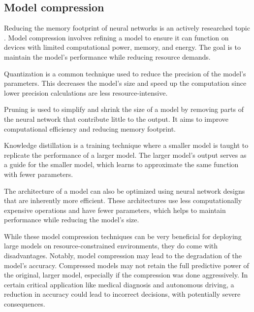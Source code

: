 \subsection{Model compression}
Reducing the memory footprint of neural networks is an actively researched topic \cite{neillOverviewNeuralNetwork2020, leEfficientNeuralNetworks2023}.
Model compression involves refining a model to ensure it can function on devices with limited computational power, memory, and energy.
The goal is to maintain the model's performance while reducing resource demands.

Quantization is a common technique used to reduce the precision of the model's parameters.
This decreases the model's size and speed up the computation since lower precision calculations are less resource-intensive.

Pruning is used to simplify and shrink the size of a model by removing parts of the neural network that contribute little to the output.
It aims to improve computational efficiency and reducing memory footprint. 

Knowledge distillation is a training technique where a smaller model is taught to replicate the performance of a larger model.
The larger model's output serves as a guide for the smaller model, which learns to approximate the same function with fewer parameters.

The architecture of a model can also be optimized using neural network designs that are inherently more efficient.
These architectures use less computationally expensive operations and have fewer parameters, which helps to maintain performance while reducing the model's size.

While these model compression techniques can be very beneficial for deploying large models on resource-constrained environments, they do come with disadvantages.
Notably, model compression may lead to the degradation of the model's accuracy.
Compressed models may not retain the full predictive power of the original, larger model, especially if the compression was done aggressively.
In certain critical application like medical diagnosis and autonomous driving, a reduction in accuracy could lead to incorrect decisions, with potentially severe consequences.
